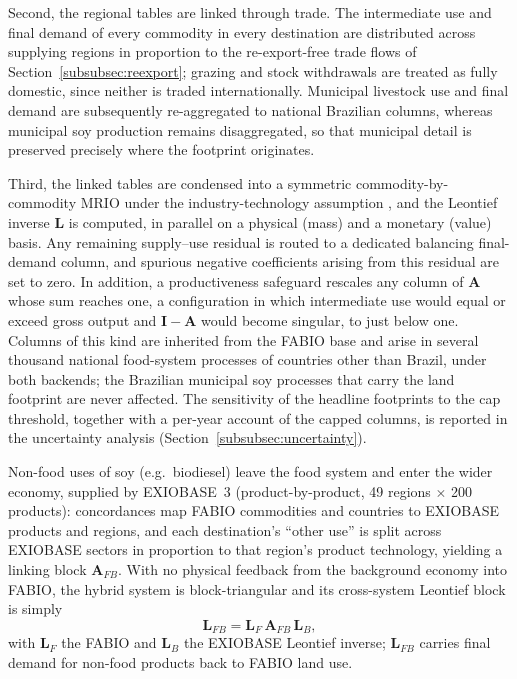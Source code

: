 \documentclass[pdflatex,sn-nature]{sn-jnl}%
\begin{document}
Second, the regional tables are linked through trade. The intermediate use
and final demand of every commodity in every destination are distributed
across supplying regions in proportion to the re-export-free trade flows of
Section~\ref{subsubsec:reexport}; grazing and stock withdrawals are treated
as fully domestic, since neither is traded internationally. Municipal
livestock use and final demand are subsequently re-aggregated to national
Brazilian columns, whereas municipal soy production remains disaggregated,
so that municipal detail is preserved precisely where the footprint
originates.

Third, the linked tables are condensed into a symmetric
commodity-by-commodity MRIO under the industry-technology assumption
\cite{millerblair2009}, and the Leontief inverse $\mathbf{L}$ is computed,
in parallel on a physical (mass) and a monetary (value) basis. Any remaining
supply--use residual is routed to a dedicated balancing final-demand column,
and spurious negative coefficients arising from this residual are set to
zero. In addition, a productiveness safeguard rescales any column of
$\mathbf{A}$ whose sum reaches one, a configuration in which intermediate
use would equal or exceed gross output and $\mathbf{I}-\mathbf{A}$ would
become singular, to just below one. Columns of this kind are inherited from
the FABIO base and arise in several thousand national food-system processes
of countries other than Brazil, under both backends; the Brazilian municipal
soy processes that carry the land footprint are never affected. The
sensitivity of the headline footprints to the cap threshold, together with a
per-year account of the capped columns, is reported in the uncertainty
analysis (Section~\ref{subsubsec:uncertainty}).

Non-food uses of soy (e.g.\ biodiesel) leave the food system and enter the
wider economy, supplied by EXIOBASE~3 \cite{stadler2018exiobase}
(product-by-product, 49 regions $\times$ 200 products): concordances map
FABIO commodities and countries to EXIOBASE products and regions, and each
destination's ``other use'' is split across EXIOBASE sectors in proportion
to that region's product technology, yielding a linking block
$\mathbf{A}_{FB}$. With no physical feedback from the background economy
into FABIO, the hybrid system is block-triangular and its cross-system
Leontief block is simply
\begin{equation}\label{eq:hybridinv}
  \mathbf{L}_{FB}=\mathbf{L}_F\,\mathbf{A}_{FB}\,\mathbf{L}_B,
\end{equation}
with $\mathbf{L}_F$ the FABIO and $\mathbf{L}_B$ the EXIOBASE Leontief
inverse; $\mathbf{L}_{FB}$ carries final demand for non-food products back
to FABIO land use.
\end{document}
